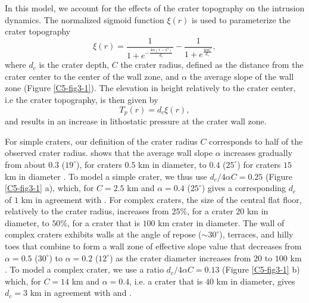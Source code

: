 In this model, we account for  the effects of the crater topography on
the intrusion  dynamics.  The normalized sigmoid  function $\xi(r)$ is
used to parameterize the crater topography
\begin{equation}
  \xi(r)=\frac{1}{1+e^{-\frac{4\alpha(r-C)}{d_c}}}-\frac{1}{1+e^{\frac{4\alpha C}{d_c}}},
  \label{C5-3-3}
\end{equation}	
where $d_c$ is the crater depth,  $C$ the crater radius, defined as
the distance  from the crater center  to the center of  the wall zone,
and   $\alpha$  the   average   slope  of   the   wall  zone   (Figure
\ref{C5-fig3-1}).  The  elevation in  height relatively to  the crater
center, i.e the crater topography, is then given by
\begin{equation}
  T_p(r)=d_c\xi(r),
  \label{C5-topo}
\end{equation}
and results in an increase in  lithostatic pressure at the crater wall
zone.
	
For  simple  craters,   our  definition  of  the   crater  radius  $C$
corresponds    to    half    of   the    observed    crater    radius.
\citet{Pike:1980eh}  shows  that  the   average  wall  slope  $\alpha$
increases gradually from about $0.3$ ($19^{\circ}$), for craters $0.5$
km  in  diameter, to  $0.4$  ($25^{\circ}$)  for  craters $15$  km  in
diameter \citep{Kalynn:2013fg}.  To model a simple crater, we thus use
$d_c/4\alpha C  =0.25$ (Figure \ref{C5-fig3-1} a),  which, for $C=2.5$
km and $\alpha=0.4$ ($25^{\circ}$) gives  a corresponding $d_c$ of $1$
km in  agreement with  \citet{Pike:1980eh}.  For complex  craters, the
size  of the  central flat  floor,  relatively to  the crater  radius,
increases from $25  \%$, for a crater  20 km in diameter,  to $50 \%$,
for a crater that is $100$ km crater in diameter.  The wall of complex
craters exhibits  walls at  the angle  of repose  ($\sim 30^{\circ}$),
terraces, and hilly toes that combine to form a wall zone of effective
slope  value  that  decreases  from $\alpha=  0.5$  ($30^{\circ}$)  to
$\alpha=0.2$ ($12^{\circ}$) as the crater diameter increases from $20$
to $100$ km \citep{Pike:1980eh,Bray:2008fu,Kalynn:2013fg}.  To model a
complex  crater,   we  use   a  ratio  $d_c/4\alpha   C=0.13$  (Figure
\ref{C5-fig3-1}  b) which,  for $C=14$  km and  $\alpha=0.4$, i.e.   a
crater that is $40$ km in diameter, gives $d_c=3$ km in agreement with
\citet{Pike:1980eh} and \citet{Kalynn:2013fg}.
	 
